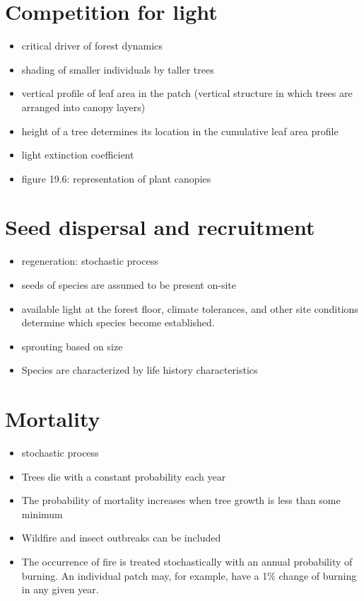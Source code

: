 \documentclass[
  oneside]{book}
\providecommand{\tightlist}{%
  \setlength{\itemsep}{0pt}\setlength{\parskip}{0pt}}
\begin{document}
\hypertarget{competition-for-light}{%
\section{Competition for light}\label{competition-for-light}}

\begin{itemize}
\tightlist
\item
  critical driver of forest dynamics
\item
  shading of smaller individuals by taller trees
\item
  vertical profile of leaf area in the patch (vertical structure in which trees are arranged into canopy layers)
\item
  height of a tree determines its location in the cumulative leaf area profile
\item
  light extinction coefficient
\item
  figure 19.6: representation of plant canopies
\end{itemize}

\hypertarget{seed-dispersal-and-recruitment}{%
\section{Seed dispersal and recruitment}\label{seed-dispersal-and-recruitment}}

\begin{itemize}
\item
  regeneration: stochastic process
\item
  seeds of species are assumed to be present on-site
\item
  available light at the forest floor, climate tolerances, and other site conditions determine which species become established.
\item
  sprouting based on size
\item
  Species are characterized by life history characteristics
\end{itemize}

\hypertarget{mortality}{%
\section{Mortality}\label{mortality}}

\begin{itemize}
\item
  stochastic process
\item
  Trees die with a constant probability each year
\item
  The probability of mortality increases when tree growth is less than some minimum
\item
  Wildfire and insect outbreaks can be included
\item
  The occurrence of fire is treated stochastically with an annual probability of burning. An individual patch may, for example, have a 1\% change of burning in any given year.
\end{itemize}
\end{document}

